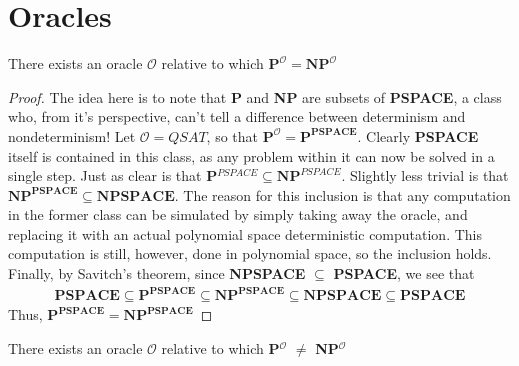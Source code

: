 \section{Oracles}
\begin{theorem}
    There exists an oracle $\mathcal{O}$ relative to which $\textbf{P}^{\mathcal{O}} = \textbf{NP}^{\mathcal{O}}$
\end{theorem}
\begin{proof}
    The idea here is to note that \textbf{P} and \textbf{NP} are subsets of \textbf{PSPACE}, a class who, from it's perspective, can't tell a difference between determinism and nondeterminism! Let $\mathcal{O} = QSAT$, so that $\textbf{P}^{\mathcal{O}} = \textbf{P}^{\textbf{PSPACE}}$. Clearly \textbf{PSPACE} itself is contained in this class, as any problem within it can now be solved in a single step. Just as clear is that \textbf{P}$^{PSPACE} \subseteq \textbf{NP}^{PSPACE}$. Slightly less trivial is that $\textbf{NP}^{\textbf{PSPACE}} \subseteq \textbf{NPSPACE}$. The reason for this inclusion is that any computation in the former class can be simulated by simply taking away the oracle, and replacing it with an actual polynomial space deterministic computation. This computation is still, however, done in polynomial space, so the inclusion holds. Finally, by Savitch's theorem, since \textbf{NPSPACE} $\subseteq$ \textbf{PSPACE}, we see that
    \begin{align}
        \textbf{PSPACE} \subseteq \textbf{P}^{\textbf{PSPACE}} \subseteq \textbf{NP}^{\textbf{PSPACE}} \subseteq \textbf{NPSPACE} \subseteq \textbf{PSPACE}
    \end{align}
    Thus, $\textbf{P}^{\textbf{PSPACE}} = \textbf{NP}^{\textbf{PSPACE}}$
\end{proof}
\begin{theorem}
    There exists an oracle $\mathcal{O}$ relative to which \textbf{P$^{\mathcal{O}}$} $\neq$ \textbf{NP}$^{\mathcal{O}}$ 
\end{theorem}
